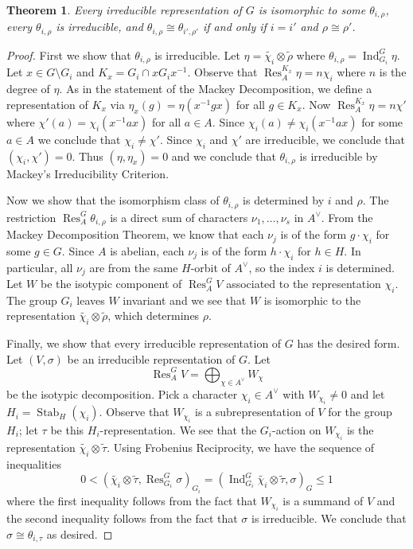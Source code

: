 \documentclass[12pt]{article}
\theoremstyle{plain}
\newtheorem{theorem}{Theorem}[section]
\theoremstyle{definition}
\theoremstyle{remark}
\numberwithin{equation}{section}
\begin{document}
\begin{theorem}
Every irreducible representation of $G$ is isomorphic to some
$\theta_{i,\rho}$,
every $\theta_{i,\rho}$ is irreducible, and
$\theta_{i,\rho} \cong \theta_{i', \rho'}$ if and only if 
$i=i'$ and $\rho \cong \rho'$.
\end{theorem}

\begin{proof}
First we show that $\theta_{i,\rho}$ is irreducible.
Let $\eta = \widetilde{\chi_i} \otimes \widetilde{\rho}$
where $\theta_{i,\rho} = \operatorname{Ind}_{G_i}^G \eta$.
Let $x \in G \setminus G_i$ and $K_x = G_i \cap xG_ix^{-1}$.
Observe that $\operatorname{Res}^{K_x}_A \eta = n\chi_i$
where $n$ is the degree of $\eta$.
As in the statement of the Mackey Decomposition,
we define a representation of $K_x$ via
$\eta_x (g) = \eta(x^{-1}gx)$ for all $g \in K_x$.
Now $\operatorname{Res}^{K_x}_A \eta = n\chi'$
where $\chi'(a) = \chi_i(x^{-1}ax)$ for all $a \in A$.
Since $\chi_i(a) \ne \chi_i(x^{-1}ax)$ for some $a \in A$
we conclude that $\chi_i \ne \chi'$.
Since $\chi_i$ and $\chi'$ are irreducible, we conclude that
$(\chi_i, \chi')=0$.  Thus $(\eta,\eta_x)=0$ and we
conclude that $\theta_{i,\rho}$ is irreducible by Mackey's
Irreducibility Criterion.

Now we show that the isomorphism class of $\theta_{i,\rho}$
is determined by $i$ and $\rho$.
The restriction $\operatorname{Res}^G_A \theta_{i,\rho}$
is a direct sum of characters $\nu_1,\ldots,\nu_s$ in $A^\vee$.
From the Mackey Decomposition Theorem, we know that each
$\nu_j$ is of the form $g \cdot \chi_i$ for some $g \in G$.
Since $A$ is abelian, each $\nu_j$ is of the form $h \cdot \chi_i$
for $h \in H$.  In particular, all $\nu_j$ are from the same $H$-orbit
of $A^\vee$, so the index $i$ is determined.
Let $W$ be the isotypic component of $\operatorname{Res}^G_A V$
associated to the representation $\chi_i$.
The group $G_i$ leaves $W$ invariant and we see that 
$W$ is isomorphic to the representation
$\widetilde{\chi_i} \otimes \widetilde{\rho}$,
which determines $\rho$.

Finally, we show that every irreducible representation of $G$ has the
desired form.  Let $(V, \sigma)$ be an irreducible representation of $G$.
Let
\[
\operatorname{Res}^G_A V = \bigoplus_{\chi \in A^\vee} W_\chi
\]
be the isotypic decomposition.  Pick a character $\chi_i \in A^\vee$
with $W_{\chi_i} \ne 0$ and let $H_i = \operatorname{Stab}_H(\chi_i)$.
Observe that $W_{\chi_i}$ is a subrepresentation of $V$
for the group $H_i$; let $\tau$ be this $H_i$-representation.
We see that the $G_i$-action on $W_{\chi_i}$ is the representation
$\widetilde{\chi_i} \otimes \widetilde{\tau}$.
Using Frobenius Reciprocity, we have the sequence of inequalities
\[
0 < \left( \widetilde{\chi_i} \otimes \widetilde{\tau},
\operatorname{Res}^G_{G_i} \sigma \right)_{G_i}
= \left( \operatorname{Ind}^G_{G_i} \widetilde{\chi_i} \otimes \widetilde{\tau},
\sigma \right)_{G} \le 1
\]
where the first inequality follows from the fact that
$W_{\chi_i}$ is a summand of $V$ and the second inequality
follows from the fact that $\sigma$ is irreducible.
We conclude that $\sigma \cong \theta_{i,\tau}$ as desired.
\end{proof}
\end{document}
